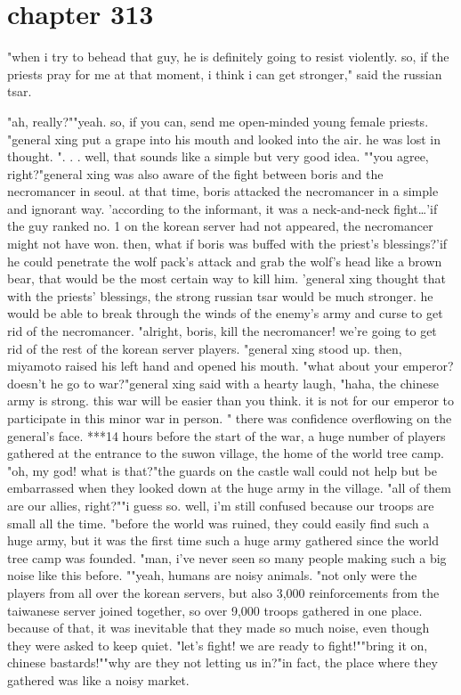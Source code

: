 \section{chapter 313}

"when i try to behead that guy, he is definitely going to resist violently.
 so, if the priests pray for me at that moment, i think i can get stronger," said the russian tsar.





"ah, really?""yeah.
 so, if you can, send me open-minded young female priests.
"general xing put a grape into his mouth and looked into the air.
 he was lost in thought.
".
.
.
well, that sounds like a simple but very good idea.
""you agree, right?"general xing was also aware of the fight between boris and the necromancer in seoul.
at that time, boris attacked the necromancer in a simple and ignorant way.
'according to the informant, it was a neck-and-neck fight…'if the guy ranked no.
 1 on the korean server had not appeared, the necromancer might not have won.
 then, what if boris was buffed with the priest's blessings?'if he could penetrate the wolf pack's attack and grab the wolf's head like a brown bear, that would be the most certain way to kill him.
'general xing thought that with the priests' blessings, the strong russian tsar would be much stronger.
 he would be able to break through the winds of the enemy's army and curse to get rid of the necromancer.
"alright, boris, kill the necromancer! we're going to get rid of the rest of the korean server players.
"general xing stood up.
 then, miyamoto raised his left hand and opened his mouth.
"what about your emperor? doesn't he go to war?"general xing said with a hearty laugh, "haha, the chinese army is strong.
 this war will be easier than you think.
 it is not for our emperor to participate in this minor war in person.
"
there was confidence overflowing on the general's face.
***14 hours before the start of the war, a huge number of players gathered at the entrance to the suwon village, the home of the world tree camp.
"oh, my god! what is that?"the guards on the castle wall could not help but be embarrassed when they looked down at the huge army in the village.
 "all of them are our allies, right?""i guess so.
 well, i'm still confused because our troops are small all the time.
"before the world was ruined, they could easily find such a huge army, but it was the first time such a huge army gathered since the world tree camp was founded.
"man, i've never seen so many people making such a big noise like this before.
""yeah, humans are noisy animals.
"not only were the players from all over the korean servers, but also 3,000 reinforcements from the taiwanese server joined together, so over 9,000 troops gathered in one place.
because of that, it was inevitable that they made so much noise, even though they were asked to keep quiet.
"let's fight! we are ready to fight!""bring it on, chinese bastards!""why are they not letting us in?"in fact, the place where they gathered was like a noisy market.

